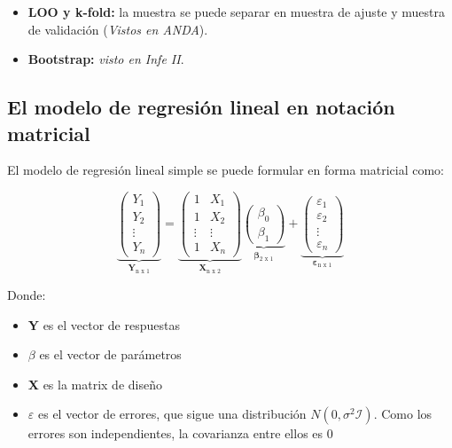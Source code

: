 \begin{itemize}
    \item \textbf{LOO y k-fold:} la muestra se puede separar en muestra de ajuste y muestra de validación (\textit{Vistos en ANDA}).
    \item \textbf{Bootstrap: }\textit{visto en Infe II}.
\end{itemize}

\subsection{El modelo de regresión lineal en notación matricial}

El modelo de regresión lineal simple se puede formular en forma matricial como:

$$
\underbrace{\begin{pmatrix}
    Y_1\\
    Y_2\\
    \vdots\\
    Y_n
\end{pmatrix}}_{\mathbf{Y}_{\text{n x 1}}} = \underbrace{\begin{pmatrix}
    1 & X_1\\
    1 & X_2\\
    \vdots & \vdots\\
    1 & X_n
\end{pmatrix}}_{\mathbf{X}_{\text{n x 2}}}\underbrace{\begin{pmatrix}
    \beta_0\\
    \beta_1
\end{pmatrix}}_{\mathbf{\beta}_{\text{2 x 1}}}+\underbrace{\begin{pmatrix}
    \varepsilon_1\\
    \varepsilon_2\\
    \vdots\\
    \varepsilon_n
\end{pmatrix}}_{\mathbf{\varepsilon}_{\text{n x 1}}}
$$

Donde:
\begin{itemize}
    \item \textbf{Y} es el vector de respuestas
    \item $\beta$ es el vector de parámetros
    \item \textbf{X} es la matrix de diseño
    \item $\varepsilon$ es el vector de errores, que sigue una distribución $N(0,\sigma^2\mathcal{I})$. Como los errores son independientes, la covarianza entre ellos es 0
\end{itemize}

